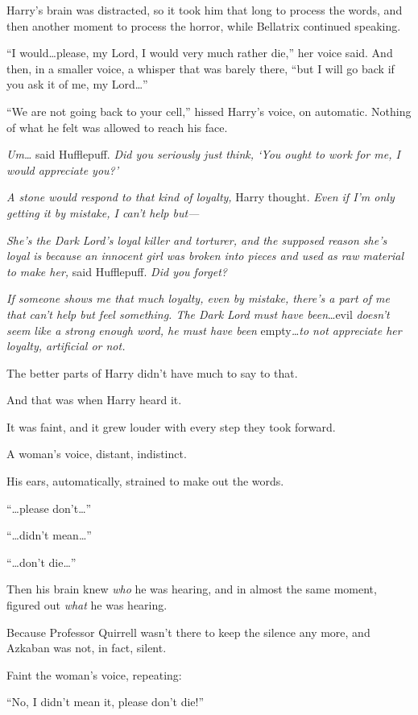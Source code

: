 Harry’s brain was distracted, so it took him that long to process the words, and then another moment to process the horror, while Bellatrix continued speaking.

“I would…please, my Lord, I would very much rather die,” her voice said. And then, in a smaller voice, a whisper that was barely there, “but I will go back if you ask it of me, my Lord…”

“We are not going back to your cell,” hissed Harry’s voice, on automatic. Nothing of what he felt was allowed to reach his face.

\emph{Um…} said Hufflepuff. \emph{Did you seriously just think, ‘You ought to work for me, \emph{I} would appreciate you?’}

\emph{A stone would respond to that kind of loyalty,} Harry thought. \emph{Even if I’m only getting it by mistake, I can’t help but—}

\emph{She’s the Dark Lord’s loyal killer and torturer, and the supposed reason she’s loyal is because an innocent girl was broken into pieces and used as raw material to make her,} said Hufflepuff. \emph{Did you forget?}

\emph{If someone shows me that much loyalty, even by mistake, there’s a part of me that can’t help but feel something. The Dark Lord must have been}…evil \emph{doesn’t seem like a strong enough word, he must have been} empty\emph{…to not appreciate her loyalty, artificial or not.}

The better parts of Harry didn’t have much to say to that.

And that was when Harry heard it.

It was faint, and it grew louder with every step they took forward.

A woman’s voice, distant, indistinct.

His ears, automatically, strained to make out the words.

“…please don’t…”

“…didn’t mean…”

“…don’t die…”

Then his brain knew \emph{who} he was hearing, and in almost the same moment, figured out \emph{what} he was hearing.

Because Professor Quirrell wasn’t there to keep the silence any more, and Azkaban was not, in fact, silent.

Faint the woman’s voice, repeating:

“No, I didn’t mean it, please don’t die!”

